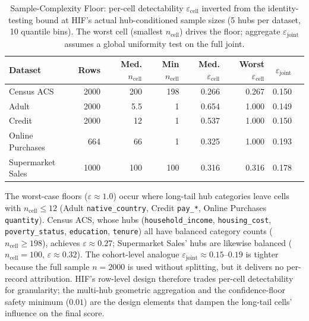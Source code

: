 \begin{table}[htbp]
\centering
\caption{Sample-Complexity Floor: per-cell detectability $\varepsilon_{\text{cell}}$ inverted from the identity-testing bound at HIF's actual hub-conditioned sample sizes (5 hubs per dataset, 10 quantile bins). The worst cell (smallest $n_{\text{cell}}$) drives the floor; aggregate $\varepsilon_{\text{joint}}$ assumes a global uniformity test on the full joint.}
\label{tab:sample_complexity}
\footnotesize
\setlength{\tabcolsep}{2.5pt}
\begin{tabular}{@{}lrrrrrrr@{}}
\toprule
Dataset & Rows & Med. $n_{\text{cell}}$ & Min $n_{\text{cell}}$ & Med. $\varepsilon_{\text{cell}}$ & Worst $\varepsilon_{\text{cell}}$ & $\varepsilon_{\text{joint}}$ \\
\midrule
Census ACS & 2000 & 200 & 198 & 0.266 & 0.267 & 0.150 \\
Adult & 2000 & 5.5 & 1 & 0.654 & 1.000 & 0.149 \\
Credit & 2000 & 12 & 1 & 0.537 & 1.000 & 0.150 \\
Online Purchases & 664 & 66 & 1 & 0.325 & 1.000 & 0.193 \\
Supermarket Sales & 1000 & 100 & 100 & 0.316 & 0.316 & 0.178 \\
\bottomrule
\end{tabular}
\end{table}

The worst-case floors ($\varepsilon \approx 1.0$) occur where long-tail hub categories leave cells with $n_{\text{cell}} \le 12$ (Adult \texttt{native\_country}, Credit \texttt{pay\_*}, Online Purchases \texttt{quantity}). Census ACS, whose hubs (\texttt{household\_income}, \texttt{housing\_cost}, \texttt{poverty\_status}, \texttt{education}, \texttt{tenure}) all have balanced category counts ($n_{\text{cell}} \ge 198$), achieves $\varepsilon \approx 0.27$; Supermarket Sales' hubs are likewise balanced ($n_{\text{cell}} = 100$, $\varepsilon \approx 0.32$). The cohort-level analogue $\varepsilon_{\text{joint}} \approx 0.15$--$0.19$ is tighter because the full sample $n=2000$ is used without splitting, but it delivers no per-record attribution. HIF's row-level design therefore trades per-cell detectability for granularity; the multi-hub geometric aggregation and the confidence-floor safety minimum ($0.01$) are the design elements that dampen the long-tail cells' influence on the final score.

